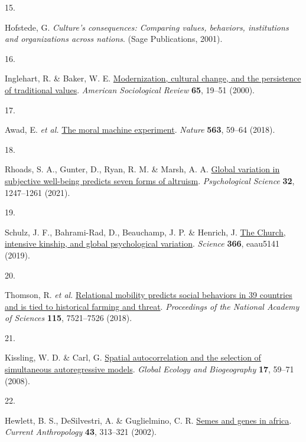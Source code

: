\documentclass[
  man,floatsintext]{apa6}
\newlength{\cslhangindent}
\newlength{\csllabelwidth}
\newlength{\cslentryspacingunit} %
\newenvironment{CSLReferences}[2] %
 {%
  \setlength{\parindent}{0pt}
  \ifodd #1
  \let\oldpar\par
  \def\par{\hangindent=\cslhangindent\oldpar}
  \fi
  \setlength{\parskip}{#2\cslentryspacingunit}
 }%
 {}
\newcommand{\CSLLeftMargin}[1]{\parbox[t]{\csllabelwidth}{#1}}
\newcommand{\CSLRightInline}[1]{\parbox[t]{\linewidth - \csllabelwidth}{#1}\break}
\begin{document}
\begin{CSLReferences}{0}{0}
\leavevmode{}%
\CSLLeftMargin{15. }%
\CSLRightInline{Hofstede, G. \emph{Culture's consequences: Comparing values, behaviors, institutions and organizations across nations}. (Sage Publications, 2001).}

\leavevmode{}%
\CSLLeftMargin{16. }%
\CSLRightInline{Inglehart, R. \& Baker, W. E. \href{https://doi.org/10.2307/2657288}{Modernization, cultural change, and the persistence of traditional values}. \emph{American Sociological Review} \textbf{65}, 19--51 (2000).}

\leavevmode{}%
\CSLLeftMargin{17. }%
\CSLRightInline{Awad, E. \emph{et al.} \href{https://doi.org/10.1038/s41586-018-0637-6}{The moral machine experiment}. \emph{Nature} \textbf{563}, 59--64 (2018).}

\leavevmode{}%
\CSLLeftMargin{18. }%
\CSLRightInline{Rhoads, S. A., Gunter, D., Ryan, R. M. \& Marsh, A. A. \href{https://doi.org/10.1177/0956797621994767}{Global variation in subjective well-being predicts seven forms of altruism}. \emph{Psychological Science} \textbf{32}, 1247--1261 (2021).}

\leavevmode{}%
\CSLLeftMargin{19. }%
\CSLRightInline{Schulz, J. F., Bahrami-Rad, D., Beauchamp, J. P. \& Henrich, J. \href{https://doi.org/10.1126/science.aau5141}{The {C}hurch, intensive kinship, and global psychological variation}. \emph{Science} \textbf{366}, eaau5141 (2019).}

\leavevmode{}%
\CSLLeftMargin{20. }%
\CSLRightInline{Thomson, R. \emph{et al.} \href{https://doi.org/10.1073/pnas.1713191115}{Relational mobility predicts social behaviors in 39 countries and is tied to historical farming and threat}. \emph{Proceedings of the National Academy of Sciences} \textbf{115}, 7521--7526 (2018).}

\leavevmode{}%
\CSLLeftMargin{21. }%
\CSLRightInline{Kissling, W. D. \& Carl, G. \href{https://doi.org/10.1111/j.1466-8238.2007.00334.x}{Spatial autocorrelation and the selection of simultaneous autoregressive models}. \emph{Global Ecology and Biogeography} \textbf{17}, 59--71 (2008).}

\leavevmode{}%
\CSLLeftMargin{22. }%
\CSLRightInline{Hewlett, B. S., DeSilvestri, A. \& Guglielmino, C. R. \href{https://doi.org/10.1086/339379}{Semes and genes in africa}. \emph{Current Anthropology} \textbf{43}, 313--321 (2002).}


\end{CSLReferences}
\end{document}
